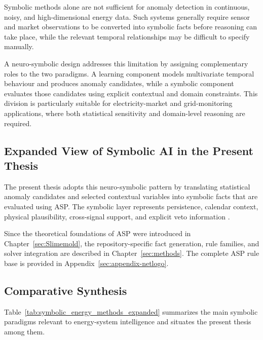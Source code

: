 Symbolic methods alone are not sufficient for anomaly detection in continuous,
noisy, and high-dimensional energy data. Such systems generally require sensor and
market observations to be converted into symbolic facts before reasoning can take
place, while the relevant temporal relationships may be difficult to specify
manually.

A neuro-symbolic design addresses this limitation by assigning complementary roles
to the two paradigms. A learning component models multivariate temporal behaviour
and produces anomaly candidates, while a symbolic component evaluates those
candidates using explicit contextual and domain constraints. This division is
particularly suitable for electricity-market and grid-monitoring applications,
where both statistical sensitivity and domain-level reasoning are required.

\subsection{Expanded View of Symbolic AI in the Present Thesis}

The present thesis adopts this neuro-symbolic pattern by translating statistical
anomaly candidates and selected contextual variables into symbolic facts that are
evaluated using ASP. The symbolic layer represents persistence, calendar context,
physical plausibility, cross-signal support, and explicit veto information
\cite{repo_thesis_grid_anomaly}.

Since the theoretical foundations of ASP were introduced in
Chapter~\ref{sec:Slimemold}, the repository-specific fact generation, rule
families, and solver integration are described in Chapter~\ref{sec:methods}. The
complete ASP rule base is provided in Appendix~\ref{sec:appendix-netlogo}.

\subsection{Comparative Synthesis}

Table~\ref{tab:symbolic_energy_methods_expanded} summarizes the main symbolic paradigms relevant to energy-system intelligence and situates the present thesis among them.

